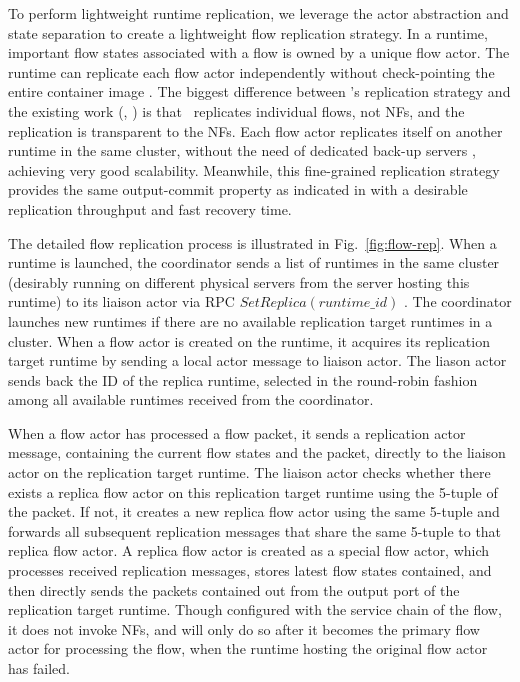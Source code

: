 To perform lightweight runtime replication, we leverage the actor 
abstraction and state separation to create a lightweight flow replication 
strategy. In a runtime, important flow states associated with a flow is 
owned by a unique flow actor. The runtime can replicate each flow actor 
independently without check-pointing the entire 
container image \cite{sherry2015rollback, rajagopalan2013pico}.  %
 The biggest difference between \nfactor's replication strategy and the existing work (\eg, \cite{sherry2015rollback}) is that \nfactor~replicates individual flows, not NFs, and the replication is transparent to the NFs. %
Each flow actor replicates itself on another runtime in the same cluster, without the need of dedicated back-up servers \cite{sherry2015rollback}, achieving very good scalability. 
Meanwhile, this fine-grained replication strategy provides the same output-commit property as indicated in \cite{sherry2015rollback} with a desirable replication throughput and fast recovery time.


The detailed flow replication process is illustrated in Fig.~\ref{fig:flow-rep}. When a runtime is launched, the coordinator sends a list of runtimes in the same cluster (desirably running on different physical servers from the server hosting this runtime) to its liaison actor via RPC $SetReplica(runtime\_id)$ . The coordinator launches new runtimes if there are no available replication target runtimes in a cluster.   When a flow actor is created on the runtime, it acquires its replication target runtime by sending a local actor message to liaison actor. The liason actor sends back the ID of the replica runtime, selected in the round-robin fashion among all available runtimes received from the coordinator. %

When a flow actor has processed a flow packet, it sends a replication actor message, containing the current flow states and the packet, directly to the liaison actor on the replication target runtime. The liaison actor checks whether there exists a replica flow actor on this replication target runtime using the 5-tuple of the packet. If not, it creates a new replica flow actor using the same 5-tuple and forwards all subsequent replication messages that share the same 5-tuple to that replica flow actor. A replica flow actor is created as a special flow actor, which processes received replication messages, stores latest flow states contained, and then directly sends the packets contained out from the output port of the replication target runtime. Though configured with the service chain of the flow, it does not invoke NFs, and will only do so after it becomes the primary flow actor for processing the flow, when the runtime hosting the original flow actor has failed.

